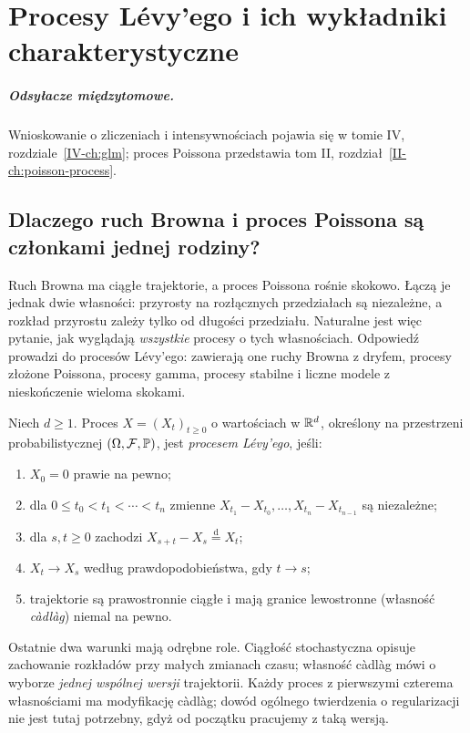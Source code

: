 \chapter{Procesy Lévy'ego i ich wykładniki charakterystyczne}
\label{ch:levy}
\paragraph{Odsyłacze międzytomowe.} Wnioskowanie o zliczeniach i intensywnościach pojawia się w tomie IV, rozdziale~\ref{IV-ch:glm}; proces Poissona przedstawia tom II, rozdział~\ref{II-ch:poisson-process}.


\section{Dlaczego ruch Browna i proces Poissona są członkami jednej rodziny?}

Ruch Browna ma ciągłe trajektorie, a proces Poissona rośnie
skokowo. Łączą je jednak dwie własności: przyrosty na rozłącznych
przedziałach są niezależne, a rozkład przyrostu zależy tylko od
długości przedziału. Naturalne jest więc pytanie, jak wyglądają
\emph{wszystkie} procesy o tych własnościach.
Odpowiedź prowadzi do procesów Lévy'ego: zawierają one
ruchy Browna z dryfem, procesy złożone Poissona, procesy gamma,
procesy stabilne i liczne modele z nieskończenie wieloma skokami.

\begin{definicja}
\label{def:levy}
Niech $d\ge1$. Proces $X=(X_t)_{t\ge0}$ o wartościach w
$\mathbb{R}^d$, określony na przestrzeni probabilistycznej
$(\Omega,\mathcal{F},\mathbb{P})$, jest \emph{procesem Lévy'ego}, jeśli:
\begin{enumerate}
\item $X_0=0$ prawie na pewno;
\item dla $0\le t_0<t_1<\cdots<t_n$ zmienne
$X_{t_1}-X_{t_0},\ldots,X_{t_n}-X_{t_{n-1}}$ są niezależne;
\item dla $s,t\ge0$ zachodzi
$X_{s+t}-X_s\overset{\mathrm d}=X_t$;
\item $X_t\to X_s$ według prawdopodobieństwa, gdy $t\to s$;
\item trajektorie są prawostronnie ciągłe i mają granice lewostronne
(własność \emph{càdlàg}) niemal na pewno.
\end{enumerate}
\end{definicja}

Ostatnie dwa warunki mają odrębne role. Ciągłość stochastyczna
opisuje zachowanie rozkładów przy małych zmianach czasu;
własność càdlàg mówi o wyborze \emph{jednej wspólnej wersji}
trajektorii. Każdy proces z pierwszymi czterema własnościami
ma modyfikację càdlàg; dowód ogólnego twierdzenia o regularizacji
nie jest tutaj potrzebny, gdyż od początku pracujemy z taką wersją.

